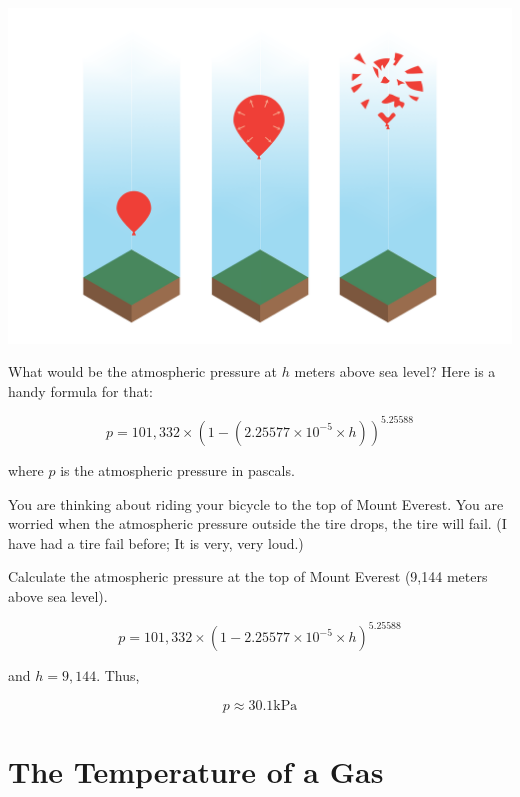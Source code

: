 \includegraphics[width=\textwidth]{balloonColumn.png}

What would be the atmospheric pressure at $h$ meters above sea level?  Here is a handy formula for that:

$$p = 101,332 \times \left(1 - \left( 2.25577 \times 10^{-5} \times h\right) \right)^{5.25588}$$

where $p$ is the atmospheric pressure in pascals.

\begin{Exercise}[title={Atmospheric Pressure},  label=atmos_pressure]
  
You are thinking about riding your bicycle to the top of Mount Everest.  You are worried when the atmospheric pressure outside the tire drops,  the tire will fail.  
(I have had a tire fail before; It is very, very loud.)  

Calculate the atmospheric pressure at the top of Mount Everest (9,144 meters above sea level).

\end{Exercise}
\begin{Answer}[ref=atmos_pressure]

$$p = 101,332 \times \left(1 - 2.25577 \times 10^{-5} \times h\right)^{5.25588}$$

and $h = 9,144$.  Thus,

$$p \approx 30.1 \text{kPa}$$

\end{Answer}

\section{The Temperature of a Gas}

